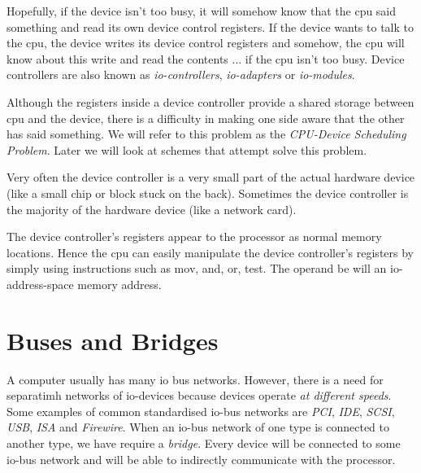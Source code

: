 Hopefully, if the device isn’t too busy, it will somehow know that the cpu said 
something and read its own device control registers. 
If the device wants to talk to the cpu, the device writes its device control registers 
and somehow, the cpu will know about this write and read the contents ... if the cpu isn’t too busy. 
Device controllers are also known as \textit{io-controllers}, 
\textit{io-adapters} or \textit{io-modules}. 

Although the registers inside a device controller provide a shared storage between cpu 
and the device, there is a difficulty in making one side aware that the other has said 
something. We will refer to this problem as the \textit{CPU-Device Scheduling Problem}. 
Later we will look at schemes that attempt solve this problem.

Very often the device controller is a very small part of the actual hardware device 
(like a small chip or block stuck on the back). 
Sometimes the device controller is the majority of the hardware device 
(like a network card).


The device controller’s registers appear to the processor as normal memory locations. 
Hence the cpu can easily manipulate the device controller’s registers by simply 
using instructions such as mov, and, or, test. 
The operand be will an io-address-space memory address.

\section{Buses and Bridges}

A computer usually has many io bus networks. However, there is a need for separatimh networks 
of io-devices because devices operate \textit{at different speeds}. 
Some examples of common standardised io-bus networks are \textit{PCI}, 
\textit{IDE}, \textit{SCSI}, \textit{USB}, \textit{ISA} and \textit{Firewire}. 
When an io-bus network of one type is connected to another type, we have require a \textit{bridge}. 
Every device will be connected to some io-bus network and will be able to indirectly communicate with the processor. 


